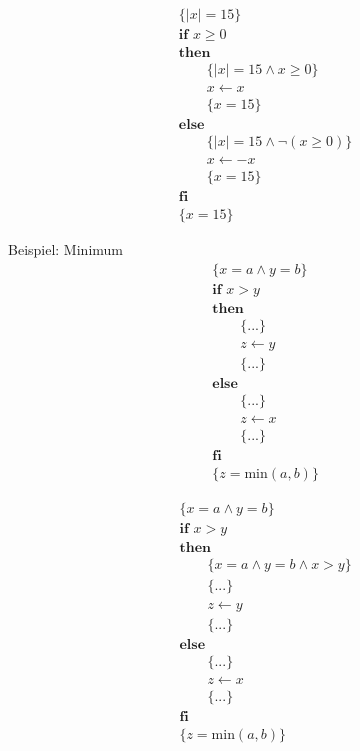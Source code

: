 \begin{frame}
  \begin{align*}
    &\{|x|=15\}\\
    &\textbf{if } x\geq 0\\
    &\textbf{then}\\
    & \qquad \{|x|=15 \land x\geq 0\}\\
    & \qquad x \leftarrow x\\
    & \qquad \{x=15\}\\
    &\textbf{else}\\
    & \qquad \{|x|=15 \land \lnot (x\geq 0)\}\\
    & \qquad x \leftarrow -x\\
    & \qquad \{x=15\}\\
    &\textbf{fi}\\
    &\{x=15\}
  \end{align*}
\end{frame}

\begin{frame}{Beispiel: Minimum}
  \begin{align*}
    &\{x=a \land y=b\}\\
    &\textbf{if } x > y\\
    &\textbf{then}\\
    & \qquad \{...\}\\
    & \qquad z \leftarrow y\\
    & \qquad \{...\}\\
    &\textbf{else}\\
    & \qquad \{...\}\\
    & \qquad z \leftarrow x\\
    & \qquad \{...\}\\
    &\textbf{fi}\\
    &\{z=\text{min}(a,b)\}
  \end{align*}
\end{frame}

\begin{frame}
  \begin{minipage}{\textwidth}
    \begin{align*}
      &\{x=a \land y=b\}\\
      &\textbf{if } x > y\\
      &\textbf{then}\\
      & \qquad \{x=a \land y=b \land x>y\}\\
      & \qquad \{...\}\\
      & \qquad z \leftarrow y\\
      & \qquad \{...\}\\
      &\textbf{else}\\
      & \qquad \{...\}\\
      & \qquad z \leftarrow x\\
      & \qquad \{...\}\\
      &\textbf{fi}\\
      &\{z=\text{min}(a,b)\}
    \end{align*}
  \end{minipage}
\end{frame}

